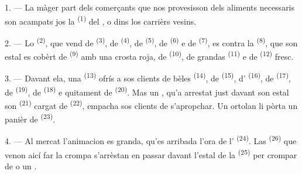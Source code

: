
\VUsaut{4.0mm}
\VUsaut{3.0mm}

\VUsaut{3.0mm}

1. --- La màger part dels comerçants que nos provesisson dels aliments
necessaris son acampats jos la  \textsuperscript{(1)} del , o dins los carrièrs vesins.

2. --- Lo  \textsuperscript{(2)}, que vend de 
\textsuperscript{(3)}, de  \textsuperscript{(4)}, de
 \textsuperscript{(5)}, de  \textsuperscript{(6)} e
de  \textsuperscript{(7)}, es contra la  \textsuperscript{(8)}, que son estal es cobèrt de
 \textsuperscript{(9)} amb una crosta roja, de
 \textsuperscript{(10)}, de grandas 
\textsuperscript{(11)} e de  \textsuperscript{(12)} fresc.

3. --- Davant ela, una  \textsuperscript{(13)} ofrís a sos
clients de bèles  \textsuperscript{(14)}, de 
\textsuperscript{(15)}, d' \textsuperscript{(16)}, de
 \textsuperscript{(17)}, de 
\textsuperscript{(19)}, de  \textsuperscript{(18)} e quitament de
 \textsuperscript{(20)}. Mas un , qu'a arrestat
just davant son estal son  \textsuperscript{(21)} cargat
de  \textsuperscript{(22)}, empacha sos clients de
s'apropchar. Un ortolan li pòrta un panièr de 
\textsuperscript{(23)}.

\VUsaut{4.0mm}
\VUsaut{3.0mm}

4. --- Al mercat l'animacion es granda, qu'es arribada l'ora de l'
\textsuperscript{(24)}. Las  \textsuperscript{(26)}
que venon aicí far la crompa s'arrèstan en passar davant l'estal de la
 \textsuperscript{(25)} per crompar de  o un
.

